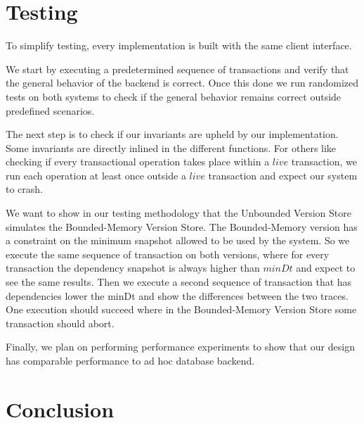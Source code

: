 \documentclass[systeme,french,english]{compas2022}
\begin{document}


\section{Testing}

To simplify testing, every implementation is built with the same client interface. 

We start by executing a predetermined sequence of transactions and verify that the general behavior of the backend is correct.
Once this done we run randomized tests on both systems to check if the general behavior remains correct outside predefined scenarios.

The next step is to check if our invariants are upheld by our implementation.
Some invariants are directly inlined in the different functions.
For others like checking if every transactional operation takes place within a $\mathit{live}$ transaction, we run each operation at least once outside a $\mathit{live}$ transaction and expect our system to crash.

We want to show in our testing methodology that the Unbounded Version Store simulates the Bounded-Memory Version Store.
The Bounded-Memory version has a constraint on the minimum snapshot allowed to be used by the system.
So we execute the same sequence of transaction on both versions, where for every transaction the dependency snapshot is always higher than $\mathit{minDt}$ and expect to see the same results.
Then we execute a second sequence of transaction that has dependencies lower the minDt and show the differences between the two traces.
One execution should succeed where in the Bounded-Memory Version Store some transaction should abort.

Finally, we plan on performing performance experiments to show that our design has comparable performance to ad hoc database backend.

\section{Conclusion}
\end{document}
